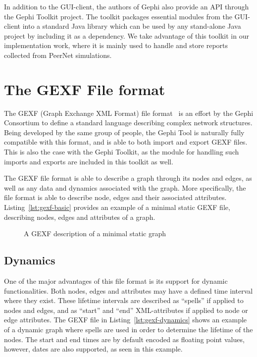 In addition to the GUI-client, the authors of Gephi also provide an API
through the Gephi Toolkit project. The toolkit packages essential
modules from the GUI-client into a standard Java library which can
be used by any stand-alone Java project by including it as a dependency.
We take advantage of this toolkit in our implementation work, where it
is mainly used to handle and store reports collected from PeerNet
simulations.

\section{The GEXF File format}

The GEXF (Graph Exchange XML Format) file format~\cite{gexf} is an
effort by the Gephi Consortium to define a standard language describing
complex network structures. Being developed by the same group of people,
the Gephi Tool is naturally fully compatible with this format, and is
able to both import and export GEXF files. This is also the case with
the Gephi Toolkit, as the module for handling such imports and exports
are included in this toolkit as well.

The GEXF file format is able to describe a graph through its nodes and
edges, as well as any data and dynamics associated with the graph. More
specifically, the file format is able to describe node, edges and their
associated attributes. Listing~\ref{lst:gexf-basic} provides an example
of a minimal static GEXF file, describing nodes, edges and attributes of
a graph.

\begin{figure}

\caption{A GEXF description of a minimal static graph}
\end{figure}

\subsection{Dynamics}

One of the major advantages of this file format is its support for
dynamic functionalities.  Both nodes, edges and attributes may have a
defined time interval where they exist. These lifetime intervals are
described as ``spells'' if applied to nodes and edges, and as ``start''
and ``end'' XML-attributes if applied to node or edge attributes. The
GEXF file in Listing~\ref{lst:gexf-dynamics} shows an example of a
dynamic graph where spells are used in order to determine the lifetime
of the nodes. The start and end times are by default encoded as
floating point values, however, dates are also supported, as seen in this example.

